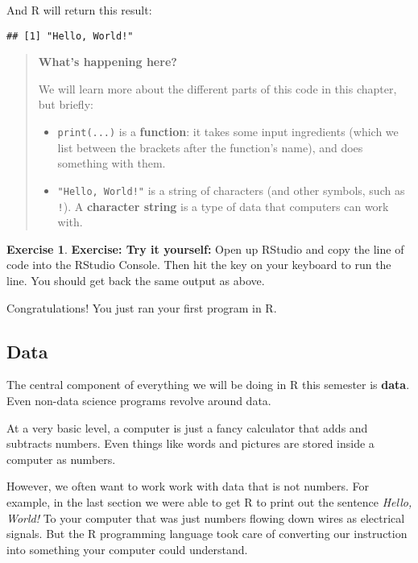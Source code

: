 \documentclass[
]{article}
\providecommand{\tightlist}{%
  \setlength{\itemsep}{0pt}\setlength{\parskip}{0pt}}
\theoremstyle{definition}
\theoremstyle{definition}
\theoremstyle{definition}
\newtheorem{exercise}{Exercise}[section]
\theoremstyle{definition}
\theoremstyle{remark}
\begin{document}
And R will return this result:

\begin{verbatim}
## [1] "Hello, World!"
\end{verbatim}

\begin{quote}
\textbf{What's happening here?}

We will learn more about the different parts of this code in this chapter,
but briefly:

\begin{itemize}
\tightlist
\item
  \texttt{print(...)} is a \textbf{function}: it takes some input ingredients (which we
  list between the brackets after the function's name), and does something
  with them.
\item
  \texttt{"Hello,\ World!"} is a string of characters (and other symbols, such as
  \texttt{!}). A \textbf{character string} is a type of data that computers can work with.
\end{itemize}
\end{quote}

\begin{exercise}
\textbf{Exercise: Try it yourself:} Open up RStudio and copy the line of code into the RStudio
Console. Then hit the key on your keyboard to run the line. You should
get back the same output as above.

Congratulations! You just ran your first program in R.
\end{exercise}

\hypertarget{data}{%
\subsection{Data}\label{data}}

The central component of everything we will be doing in R this semester is \textbf{data}. Even non-data science programs revolve around data.

At a very basic level, a computer is just a fancy calculator that adds and subtracts numbers. Even things like words and pictures are stored inside a computer as numbers.

However, we often want to work work with data that is not numbers. For example, in the last section we were able to get R to print out the sentence \emph{Hello, World!} To your computer that was just numbers flowing down wires as electrical signals. But the R programming language took care of converting our instruction into something your computer could understand.
\end{document}
